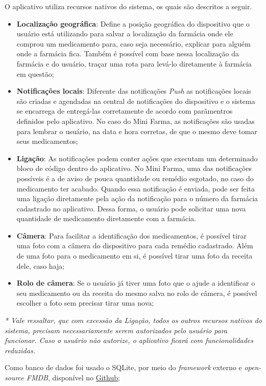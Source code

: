 O aplicativo utiliza recursos nativos do sistema, os quais são descritos a seguir. 
\begin{itemize}
	\item \textbf{Localização geográfica}: Define a posição geográfica do dispositivo que o usuário está utilizando para salvar a 
    localização da farmácia onde ele comprou um medicamento para, caso seja necessário, explicar para alguém onde a 
    farmácia fica. Também é possível com base nessa localização da farmácia e do usuário, traçar uma rota para levá-lo diretamente à 
    farmácia em questão;
	\item \textbf{Notificações locais}: Diferente das notificações \textit{Push} as notificações locais são criadas e agendadas na central 
    de notificações do dispositivo e o sistema se encarrega de entregá-las corretamente de acordo com parâmentros definidos pelo aplicativo. 
    No caso do Mini Farma, as notificações são usadas para lembrar o usuário, na data e hora corretas, de que o mesmo deve tomar seus medicamentos;
	\item \textbf{Ligação}: As notificações podem conter ações que executam um determinado bloco de código dentro do aplicativo. No Mini Farma, 
    uma das notificações possíveis é a de aviso de pouca quantidade ou remédio esgotado, no caso do medicamento ter acabado. 
    Quando essa notificação é enviada, pode ser feita uma ligação diretamente pela ação da notificação para o número da 
    farmácia cadastrado no aplicativo. Dessa forma, o usuário pode solicitar uma nova quantidade de medicamento diretamente com a farmácia. 
	\item \textbf{Câmera}: Para facilitar a identificação dos medicamentos, é possível tirar uma foto com a câmera do dispositivo para 
    cada remédio cadastrado. Além de uma foto para o medicamento em si, é possível tirar uma foto da receita dele, caso haja;
    \item \textbf{Rolo de câmera}: Se o usuário já tiver uma foto que o ajude a identificar o seu medicamento ou da receita do mesmo salva 
    no rolo de câmera, é possível escolher a foto sem precisar tirar uma nova;
\end{itemize}

\textit{* Vale ressaltar, que com excessão da Ligação, todos os outros recursos nativos do sistema, precisam necessariamente serem autorizados pelo
usuário para funcionar. Caso o usuário não autorize, o aplicativo ficará com funcionalidades reduzidas.} 


Como banco de dados foi usado o SQLite, por meio do \textit{framework} externo e \textit{open-source FMDB}, 
disponível no \href{https://github.com/ccgus/fmdb}{Github};

